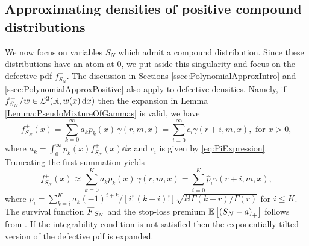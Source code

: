 \subsection{Approximating densities of positive compound distributions}
We now focus on variables $S_N$ which admit a compound distribution. Since these distributions have an atom at 0, we put aside this singularity and focus on the defective pdf $f_{S_N}^+$. The discussion in Sections \ref{ssec:PolynomialApproxIntro} and \ref{ssec:PolynomialApproxPositive} also apply to defective densities. Namely, if $f_{S_N}^{+}/w\in \mathcal{L}^2(\mathbb{R}, w(x) \mathop{}\!\mathrm{d} x)$ then the expansion in Lemma \ref{Lemma:PseudoMixtureOfGammas} is valid, we have
\begin{equation*}\label{eq:PseudoErlangMixtureRepresentationDefectivePDF}
f_{S_N}^+(x)= \sum_{k=0}^\infty a_k p_k(x) \, \gamma(r, m, x) = \sum_{i=0}^{\infty} c_i \gamma(r+i,m,x),\text{ for }x>0,
\end{equation*}
where $a_k=\int_{0}^{\infty}p_{k}(x)f_{S_N}^+(x)\dd x$ and $c_i$ is given by \eqref{eq:PiExpression}.
Truncating the first summation yields
\begin{equation*}\label{eq:ApproxPolynomialRepresentation}
f_{S_N}^{+}(x)
\approx \sum_{k=0}^{K} a_k p_{k}(x) \, \gamma(r,m,x)
= \sum_{i=0}^{K} \widehat{p}_i\gamma(r+i,m,x),
\end{equation*}
where $\widehat{p}_i =\sum_{k=i}^K a_k (-1)^{i+k} / [i! \, (k-i)! ] \sqrt{k! \Gamma(k+r) / \Gamma(r)}$ for $i \le K$. The survival function $\Ftail_{S_N}$ and the stop-loss premium $\operatorname{{\mathbb E}}\left[\left(S_N-a\right)_{+}\right]$ follows from . If the integrability condition is not satisfied then the exponentially tilted version of the defective pdf is expanded.

